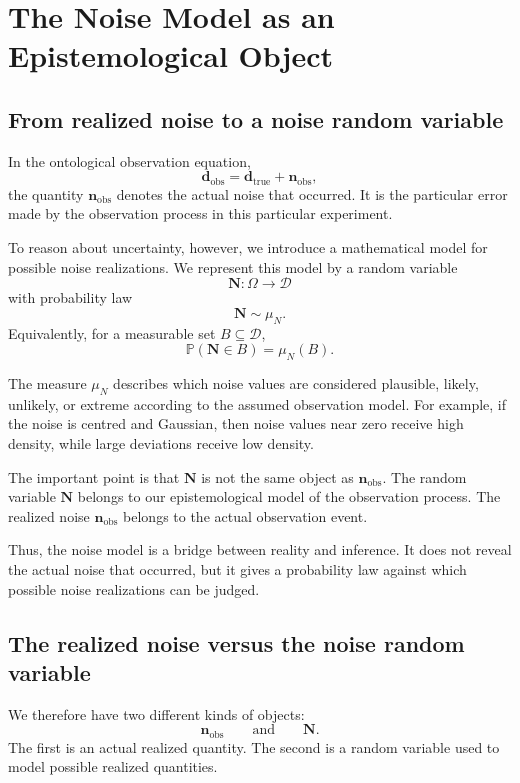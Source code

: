 \documentclass[11pt]{article}
\newcommand{\Dspace}{\mathcal D}
\newcommand{\muN}{\mu_N}
\newcommand{\Nrand}{\mathbf N}
\newcommand{\dtrue}{\mathbf d_{\mathrm{true}}}
\newcommand{\dobs}{\mathbf d_{\mathrm{obs}}}
\newcommand{\nobs}{\mathbf n_{\mathrm{obs}}}
\newcommand{\Prob}{\mathbb P}
\begin{document}
\section{The Noise Model as an Epistemological Object}

\subsection{From realized noise to a noise random variable}

In the ontological observation equation,
\[
    \dobs=\dtrue+\nobs,
\]
the quantity \(\nobs\) denotes the actual noise that occurred. It is the particular error made by the observation process in this particular experiment.

To reason about uncertainty, however, we introduce a mathematical model for possible noise realizations. We represent this model by a random variable
\[
    \Nrand:\Omega\to\Dspace
\]
with probability law
\[
    \Nrand\sim\muN.
\]
Equivalently, for a measurable set \(B\subseteq\Dspace\),
\[
    \Prob(\Nrand\in B)=\muN(B).
\]

The measure \(\muN\) describes which noise values are considered plausible, likely, unlikely, or extreme according to the assumed observation model. For example, if the noise is centred and Gaussian, then noise values near zero receive high density, while large deviations receive low density.

The important point is that \(\Nrand\) is not the same object as \(\nobs\). The random variable \(\Nrand\) belongs to our epistemological model of the observation process. The realized noise \(\nobs\) belongs to the actual observation event.

Thus, the noise model is a bridge between reality and inference. It does not reveal the actual noise that occurred, but it gives a probability law against which possible noise realizations can be judged.

\subsection{The realized noise versus the noise random variable}

We therefore have two different kinds of objects:
\[
    \nobs
    \qquad
    \text{and}
    \qquad
    \Nrand.
\]
The first is an actual realized quantity. The second is a random variable used to model possible realized quantities.
\end{document}
